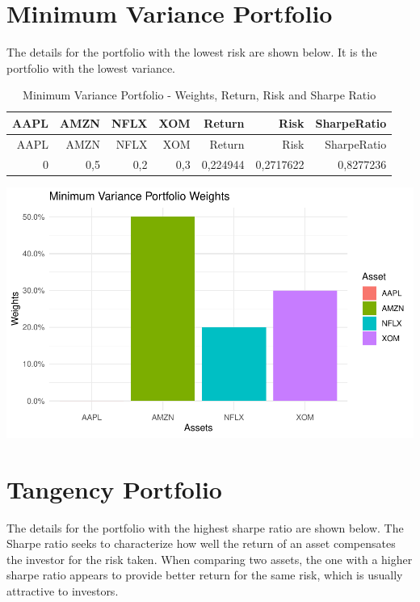 \documentclass[
]{article}
\begin{document}
\newpage

\hypertarget{minimum-variance-portfolio}{%
\section{Minimum Variance Portfolio}\label{minimum-variance-portfolio}}

The details for the portfolio with the lowest risk are shown below. It
is the portfolio with the lowest variance.

\begin{longtable}[]{@{}rrrrrrr@{}}
\caption{Minimum Variance Portfolio - Weights, Return, Risk and Sharpe
Ratio}\tabularnewline
\toprule()
AAPL & AMZN & NFLX & XOM & Return & Risk & SharpeRatio \\
\midrule()
\endfirsthead
\toprule()
AAPL & AMZN & NFLX & XOM & Return & Risk & SharpeRatio \\
\midrule()
\endhead
0 & 0,5 & 0,2 & 0,3 & 0,224944 & 0,2717622 & 0,8277236 \\
\bottomrule()
\end{longtable}

\begin{center}\includegraphics{EfficientFrontier_files/figure-latex/plot Minimum Variance Portfolio-1} \end{center}

\newpage

\hypertarget{tangency-portfolio}{%
\section{Tangency Portfolio}\label{tangency-portfolio}}

The details for the portfolio with the highest sharpe ratio are shown
below. The Sharpe ratio seeks to characterize how well the return of an
asset compensates the investor for the risk taken. When comparing two
assets, the one with a higher sharpe ratio appears to provide better
return for the same risk, which is usually attractive to investors.
\end{document}

